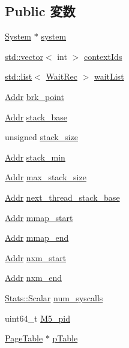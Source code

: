 \subsection*{Public 変数}
\begin{DoxyCompactItemize}
\item 
\hyperlink{classSystem}{System} $\ast$ \hyperlink{classProcess_af27ccd765f13a4b7bd119dc7579e2746}{system}
\item 
\hyperlink{classstd_1_1vector}{std::vector}$<$ int $>$ \hyperlink{classProcess_a64a72121f39c3cbc68bb1b863c3f43ed}{contextIds}
\item 
\hyperlink{classstd_1_1list}{std::list}$<$ \hyperlink{structProcess_1_1WaitRec}{WaitRec} $>$ \hyperlink{classProcess_a8af61364ae9c966602b3b5ec1c0f7f09}{waitList}
\item 
\hyperlink{base_2types_8hh_af1bb03d6a4ee096394a6749f0a169232}{Addr} \hyperlink{classProcess_aa0d3d9ff2a6fcb719d3b83226bb50638}{brk\_\-point}
\item 
\hyperlink{base_2types_8hh_af1bb03d6a4ee096394a6749f0a169232}{Addr} \hyperlink{classProcess_a9301d238f8ee69de69d9a608f23b0ee2}{stack\_\-base}
\item 
unsigned \hyperlink{classProcess_a846e164ff6493f2b7001b0adc9dfe535}{stack\_\-size}
\item 
\hyperlink{base_2types_8hh_af1bb03d6a4ee096394a6749f0a169232}{Addr} \hyperlink{classProcess_a03ca56edd14eafca9beec28c150e05a6}{stack\_\-min}
\item 
\hyperlink{base_2types_8hh_af1bb03d6a4ee096394a6749f0a169232}{Addr} \hyperlink{classProcess_a02d0240a7f8b3d791b54cd01f9370121}{max\_\-stack\_\-size}
\item 
\hyperlink{base_2types_8hh_af1bb03d6a4ee096394a6749f0a169232}{Addr} \hyperlink{classProcess_a55a3705006af6c58cba9f9a23ba89864}{next\_\-thread\_\-stack\_\-base}
\item 
\hyperlink{base_2types_8hh_af1bb03d6a4ee096394a6749f0a169232}{Addr} \hyperlink{classProcess_a39ba573f8e6f0a0f33a82245af695ffc}{mmap\_\-start}
\item 
\hyperlink{base_2types_8hh_af1bb03d6a4ee096394a6749f0a169232}{Addr} \hyperlink{classProcess_a41a18edd0dbae5a7bb12e20a30c2e3e1}{mmap\_\-end}
\item 
\hyperlink{base_2types_8hh_af1bb03d6a4ee096394a6749f0a169232}{Addr} \hyperlink{classProcess_a2e51a258c95c46a8e3b3b4c2c74795e6}{nxm\_\-start}
\item 
\hyperlink{base_2types_8hh_af1bb03d6a4ee096394a6749f0a169232}{Addr} \hyperlink{classProcess_aa47cd9dfc4d79b68bb78ee4b10b8298d}{nxm\_\-end}
\item 
\hyperlink{classStats_1_1Scalar}{Stats::Scalar} \hyperlink{classProcess_a71ce639346bf9b5caabdf218544e302a}{num\_\-syscalls}
\item 
uint64\_\-t \hyperlink{classProcess_a570045a30dc7f4c596f2fa18dfdfbed5}{M5\_\-pid}
\item 
\hyperlink{classPageTable}{PageTable} $\ast$ \hyperlink{classProcess_ad14ffa23ad731f6003755b643f999049}{pTable}
\end{DoxyCompactItemize}
